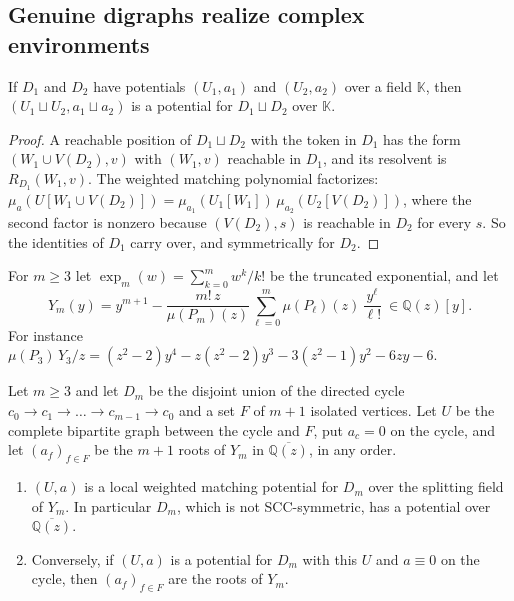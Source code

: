 \documentclass[final]{siamart0516}
\numberwithin{theorem}{section}
\numberwithin{equation}{section}
\theoremstyle{siamnonum}
\theoremstyle{plain}
\newcommand{\QQ}{\mathbb{Q}}
\newcommand{\Qz}{\QQ(z)}
\newcommand{\Qzbar}{\overline{\QQ(z)}}
\begin{document}
\subsection{Genuine digraphs realize complex environments}\label{ssec:counterexample}

\begin{lemma}\label{lem:disjoint-union}
If $D_1$ and $D_2$ have potentials $(U_1,a_1)$ and $(U_2,a_2)$ over a field $\mathbb K$, then $(U_1\sqcup U_2,a_1\sqcup a_2)$ is a potential for $D_1\sqcup D_2$ over $\mathbb K$.
\end{lemma}
\begin{proof}
A reachable position of $D_1\sqcup D_2$ with the token in $D_1$ has the form $(W_1\cup V(D_2),v)$ with $(W_1,v)$ reachable in $D_1$, and its resolvent is $R_{D_1}(W_1,v)$. The weighted matching polynomial factorizes: $\mu_a(U[W_1\cup V(D_2)])=\mu_{a_1}(U_1[W_1])\,\mu_{a_2}(U_2[V(D_2)])$, where the second factor is nonzero because $(V(D_2),s)$ is reachable in $D_2$ for every $s$. So the identities of $D_1$ carry over, and symmetrically for $D_2$.
\end{proof}

For $m\ge3$ let $\exp_m(w)=\sum_{k=0}^{m}w^{k}/k!$ be the truncated exponential, and let
\begin{equation}\label{eq:Ym}
Y_m(y)=y^{m+1}-\frac{m!\,z}{\mu(P_m)(z)}\sum_{\ell=0}^{m}\mu(P_\ell)(z)\,\frac{y^{\ell}}{\ell!}\ \in\Qz[y].
\end{equation}
For instance $\mu(P_3)\,Y_3/z=(z^{2}-2)y^{4}-z(z^{2}-2)y^{3}-3(z^{2}-1)y^{2}-6zy-6$.

\begin{theorem}[a counterexample over $\Qzbar$]\label{thm:complex-counterexample}
Let $m\ge3$ and let $D_m$ be the disjoint union of the directed cycle $c_0\to c_1\to\dots\to c_{m-1}\to c_0$ and a set $F$ of $m+1$ isolated vertices. Let $U$ be the complete bipartite graph between the cycle and $F$, put $a_{c}=0$ on the cycle, and let $(a_f)_{f\in F}$ be the $m+1$ roots of $Y_m$ in $\Qzbar$, in any order.
\begin{enumerate}[label=\textup{(\arabic*)}]
\item $(U,a)$ is a local weighted matching potential for $D_m$ over the splitting field of $Y_m$. In particular $D_m$, which is not SCC-symmetric, has a potential over $\Qzbar$.
\item Conversely, if $(U,a)$ is a potential for $D_m$ with this $U$ and $a\equiv0$ on the cycle, then $(a_f)_{f\in F}$ are the roots of $Y_m$.
\end{enumerate}
\end{theorem}
\end{document}
